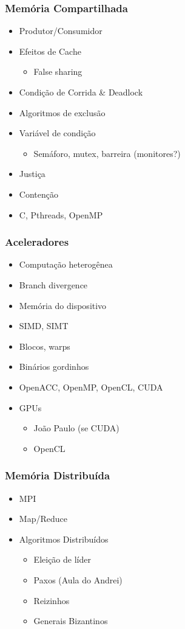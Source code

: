 \documentclass[a4paper]{article}
\begin{document}
\subsubsection{Memória Compartilhada}
\label{sec:org3555bb7}
\begin{itemize}
\item Produtor/Consumidor
\item Efeitos de Cache
\begin{itemize}
\item False sharing
\end{itemize}
\item Condição de Corrida \& Deadlock
\item Algoritmos de exclusão
\item Variável de condição
\begin{itemize}
\item Semáforo, mutex, barreira (monitores?)
\end{itemize}
\item Justiça
\item Contenção
\item C, Pthreads, OpenMP
\end{itemize}
\subsubsection{Aceleradores}
\label{sec:orgbfd7ec8}
\begin{itemize}
\item Computação heterogênea
\item Branch divergence
\item Memória do dispositivo
\item SIMD, SIMT
\item Blocos, warps
\item Binários gordinhos
\item OpenACC, OpenMP, OpenCL, CUDA
\item GPUs
\begin{itemize}
\item João Paulo (se CUDA)
\item OpenCL
\end{itemize}
\end{itemize}
\subsubsection{Memória Distribuída}
\label{sec:org5137bba}
\begin{itemize}
\item MPI
\item Map/Reduce
\item Algoritmos Distribuídos
\begin{itemize}
\item Eleição de líder
\item Paxos (Aula do Andrei)
\item Reizinhos
\item Generais Bizantinos
\end{itemize}
\end{itemize}
\end{document}

